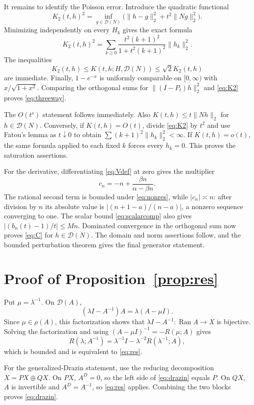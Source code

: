 \documentclass[11pt]{article}
\newcommand{\D}{\mathcal D}
\newcommand{\Rop}{R}
\begin{document}
It remains to identify the Poisson error.  Introduce the quadratic functional
\[
 K_2(t,h)^2=\inf_{g\in\D(N)}
 \bigl(\|h-g\|_2^2+t^2\|Ng\|_2^2\bigr).
\]
Minimizing independently on every $H_k$ gives the exact formula
\begin{equation}\label{eq:K2}
 K_2(t,h)^2=
 \sum_{k\geq0}\frac{t^2(k+1)^2}{1+t^2(k+1)^2}\|h_k\|_2^2.
\end{equation}
The inequalities
\[
 K_2(t,h)\leq K(t,h;H,\D(N))\leq\sqrt2K_2(t,h)
\]
are immediate.  Finally, $1-e^{-x}$ is uniformly comparable on
$[0,\infty)$ with $x/\sqrt{1+x^2}$.  Comparing the orthogonal sums for
$\|(I-P_t)h\|_2^2$ and \eqref{eq:K2} proves \eqref{eq:threeway}.

The $O(t^s)$ statement follows immediately.  Also
$K(t,h)\leq t\|Nh\|_2$ for $h\in\D(N)$.  Conversely, if
$K(t,h)=O(t)$, divide \eqref{eq:K2} by $t^2$ and use Fatou's lemma as
$t\downarrow0$ to obtain $\sum(k+1)^2\|h_k\|_2^2<\infty$.  If
$K(t,h)=o(t)$, the same formula applied to each fixed $k$ forces every
$h_k=0$.  This proves the saturation assertions.

For the derivative, differentiating \eqref{eq:Vdef} at zero gives the
multiplier
\[
 c_n=-n+\frac{\beta n}{\alpha-\beta n}.
\]
The rational second term is bounded under \eqref{eq:nonres}, while
$|c_n|\asymp n$: after division by $n$ its absolute value is
$|(n+1-a)/(n-a)|$, a nonzero sequence converging to one.  The scalar bound
\eqref{eq:scalarcomp} also gives
$|(b_n(t)-1)/t|\leq Mn$.  Dominated convergence in the orthogonal sum now
proves \eqref{eq:C} for $h\in\D(N)$.  The domain and norm assertions follow,
and the bounded perturbation theorem gives the final generator statement.

\section{Proof of Proposition~\ref{prop:res}}

Put $\mu=\lambda^{-1}$.  On $\D(A)$,
\[
 (\lambda I-A^{-1})A=\lambda(A-\mu I).
\]
Since $\mu\in\rho(A)$, this factorization shows that
$\lambda I-A^{-1}:\operatorname{Ran}A\to X$ is bijective.  Solving the
factorization and using $(A-\mu I)^{-1}=-\Rop(\mu;A)$ gives
\[
 \Rop(\lambda;A^{-1})
 =\lambda^{-1}I-\lambda^{-2}\Rop(\lambda^{-1};A),
\]
which is bounded and is equivalent to \eqref{eq:res}.

For the generalized-Drazin statement, use the reducing decomposition
$X=PX\oplus QX$.  On $PX$, $A^D=0$, so the left side of
\eqref{eq:drazin} equals $P$.  On $QX$, $A$ is invertible and
$A^D=A^{-1}$, so \eqref{eq:res} applies.  Combining the two blocks proves
\eqref{eq:drazin}.
\end{document}
